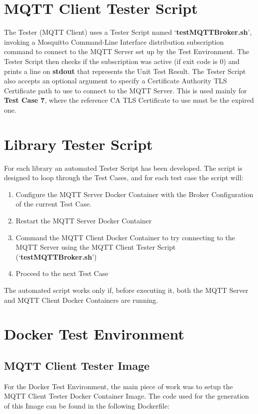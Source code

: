 \documentclass[binding=0.6cm,noexaminfo]{sapthesis}
\begin{document}
\section{MQTT Client Tester Script}

The Tester (MQTT Client) uses a Tester Script named `\textbf{testMQTTBroker.sh}', invoking a Mosquitto Command-Line Interface distribution subscription command to connect to the MQTT Server set up by the Test Environment. The Tester Script then checks if the subscription was active (if exit code is 0) and prints a line on \textbf{stdout} that represents the Unit Test Result.
The Tester Script also accepts an optional argument to specify a Certificate Authority TLS Certificate path to use to connect to the MQTT Server. This is used mainly for \textbf{Test Case 7}, where the reference CA TLS Certificate to use must be the expired one.
\section{Library Tester Script}

For each library an automated Tester Script has been developed. The script is designed to loop through the Test Cases, and for each test case the script will:
\begin{enumerate}
	\item Configure the MQTT Server Docker Container with the Broker Configuration of the current Test Case.
	\item Restart the MQTT Server Docker Container
	\item Command the MQTT Client Docker Container to try connecting to the MQTT Server using the MQTT Client Tester Script (`\textbf{testMQTTBroker.sh}')
	\item Proceed to the next Test Case
\end{enumerate}
The automated script works only if, before executing it, both the MQTT Server and MQTT Client Docker Containers are running.

\section{Docker Test Environment}\label{sec:docker_env}
\subsection{MQTT Client Tester Image}
For the Docker Test Environment, the main piece of work was to setup the MQTT Client Tester Docker Container Image. The code used for the generation of this Image can be found in the following Dockerfile:

\end{document}
